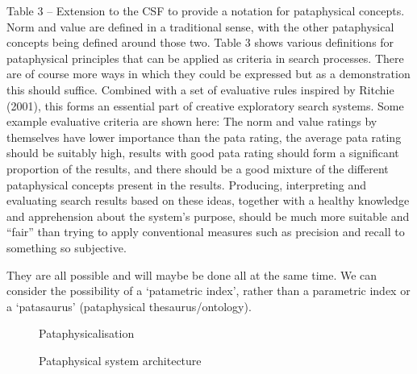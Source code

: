 \documentclass[11pt]{thesis} %
\begin{document}
Table 3 – Extension to the \ac{CSF} to provide a notation for pataphysical concepts. Norm and value are defined in a traditional sense, with the other pataphysical concepts being defined around those two.
Table 3 shows various definitions for pataphysical principles that can be applied as criteria in search processes. There are of course more ways in which they could be expressed but as a demonstration this should suffice.
	Combined with a set of evaluative rules inspired by Ritchie (2001), this forms an essential part of creative exploratory search systems. Some example evaluative criteria are shown here:
	The norm and value ratings by themselves have lower importance than the pata rating,
	the average pata rating should be suitably high,
	results with good pata rating should form a significant proportion of the results, and
	there should be a good mixture of the different pataphysical concepts present in the results.
Producing, interpreting and evaluating search results based on these ideas, together with a healthy knowledge and apprehension about the system's purpose, should be much more suitable and “fair” than trying to apply conventional measures such as precision and recall to something so subjective.



















They are all possible and will maybe be done all at the same time. We can consider the possibility of a `patametric index', rather than a parametric index or a `patasaurus' (pataphysical thesaurus/ontology).

\begin{figure}[!htbp] %
  \centering
  \def\svgwidth{\columnwidth}
  
\caption[Pataphysicalisation]{Pataphysicalisation}
\label{fig:patasearch02f}
\end{figure}
\begin{figure}[!htbp]
  \centering
  \caption[Pataphysical system architecture]{Pataphysical system architecture}
  \label{fig:patarc}
\end{figure}
\end{document}
